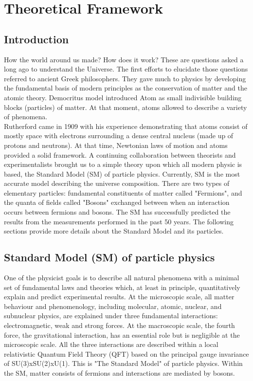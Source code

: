 \newpage
\chapter{Theoretical Framework}
\label{chap1}
\section{Introduction}
\label{chap1:intro}
How the world around us made? How does it work? These are questions asked a long ago to understand the Universe. The first efforts to elucidate those questions referred to ancient Greek philosophers. They gave much to physics by developing the fundamental basis of modern principles as the conservation of matter and the atomic theory. Democritus model introduced Atom as small indivisible building blocks (particles) of matter. At that moment, atoms allowed to describe a variety of phenomena. \\
Rutherford came in 1909 with his experience demonstrating that atoms consist of mostly space with electrons surrounding a dense central nucleus (made up of protons and neutrons). At that time, Newtonian laws of motion and atoms provided a solid framework. A continuing collaboration between theorists and experimentalists brought us to a simple theory upon which all modern physic is based, the Standard Model (SM) of particle physics. Currently, SM is the most accurate model describing the universe composition. There are two types of elementary particles: fundamental constituents of matter called "Fermions", and the quanta of fields called "Bosons" exchanged between when an interaction occurs between fermions and bosons. The SM has successfully predicted the results from the measurements performed in the past 50 years. The following sections provide more details about the Standard Model and its particles.

\section{Standard Model (SM) of particle physics}
\label{chap1:SM}
One of the physicist goals is to describe all natural phenomena with a minimal set of fundamental laws and theories which, at least in principle, quantitatively explain and predict experimental results. At the microscopic scale, all matter behaviour and phenomenology, including molecular, atomic, nuclear, and subnuclear physics, are explained under three fundamental interactions: electromagnetic, weak and strong forces. At the macroscopic scale, the fourth force, the gravitational interaction, has an essential role but is negligible at the microscopic scale. All the three interactions are described within a local relativistic Quantum Field Theory (QFT) based on the principal gauge invariance of SU(3)xSU(2)xU(1). This is "The Standard Model" of particle physics. Within the SM, matter consists of fermions and interactions are mediated by bosons. 

